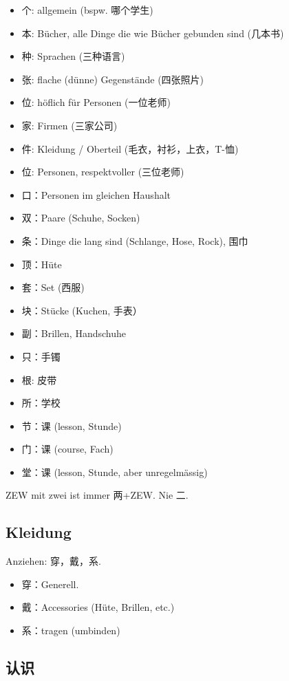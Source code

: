 \documentclass[UTF8]{ctexart}
\begin{document}
\begin{itemize}
    \item 个: allgemein (bspw. 哪个学生)
    \item 本: Bücher, alle Dinge die wie Bücher gebunden sind (几本书)
    \item 种: Sprachen (三种语言)
    \item 张: flache (dünne) Gegenstände (四张照片)
    \item 位: höflich für Personen (一位老师)
    \item 家: Firmen (三家公司)
    \item 件: Kleidung / Oberteil (毛衣，衬衫，上衣，T-恤)
    \item 位: Personen, respektvoller (三位老师)
    \item 口：Personen im gleichen Haushalt
    \item 双：Paare (Schuhe, Socken)
    \item 条：Dinge die lang sind (Schlange, Hose, Rock), 围巾
    \item 顶：Hüte
    \item 套：Set (西服)
    \item 块：Stücke (Kuchen, 手表）
    \item 副：Brillen, Handschuhe
    \item 只：手镯
    \item 根: 皮带
    \item 所：学校
    \item 节：课 (lesson, Stunde)
    \item 门：课 (course, Fach)
    \item 堂：课 (lesson, Stunde, aber unregelmässig)
\end{itemize}

ZEW mit zwei ist immer 两+ZEW. Nie 二.

\subsection{Kleidung}

Anziehen: 穿，戴，系.

\begin{itemize}
    \item 穿：Generell.
    \item 戴：Accessories (Hüte, Brillen, etc.)
    \item 系：tragen (umbinden)
\end{itemize}

\subsection{认识}
\end{document}
